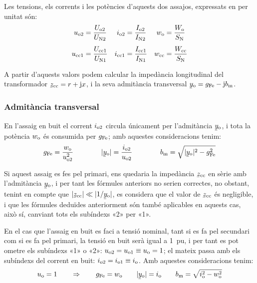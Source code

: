 Les tensions, els corrents i les potències d'aquests dos  assajos,
expressats en per unitat són:
\begin{align}
    u_\mathrm{o2} &=\frac{U_\mathrm{o2}}{U_\mathrm{N2}} &
    i_\mathrm{o2} &=\frac{I_\mathrm{o2}}{I_\mathrm{N2}} &
    w_\mathrm{o}  &=\frac{W_\mathrm{o}}{S_\mathrm{N}} \\[1ex]
    u_\mathrm{cc1} &=\frac{U_\mathrm{cc1}}{U_\mathrm{N1}} &
    i_\mathrm{cc1} &=\frac{I_\mathrm{cc1}}{I_\mathrm{N1}} &
    w_\mathrm{cc} &=\frac{W_\mathrm{cc}}{S_\mathrm{N}}
\end{align}

A partir d'aquests valors podem calcular la impedància longitudinal
del transformador $\cmplx{z}\ped{cc}=r+\ju x$, i la seva admitància
transversal $\cmplx{y}\ped{o}=g\ped{Fe}-\ju b\ped{m}$.

\subsubsection{Admitància transversal}

En l'assaig en buit el corrent $i_\mathrm{o2}$ circula
únicament per l'admitància $\cmplx{y}\ped{o}$, i tota la potència
$w_\mathrm{o}$ és consumida per $g_\mathrm{Fe}$; amb aquestes consideracions
tenim:
\begin{equation}
    g\ped{Fe} = \frac{w\ped{o}}{u\ped{o2}^2} \qquad\qquad
    |\cmplx{y}\ped{o}| = \frac{i\ped{o2}}{u\ped{o2}}
    \qquad\qquad
    b\ped{m} = \sqrt{|\cmplx{y}\ped{o}|^2 - g\ped{Fe}^2}
\end{equation}

Si aquest assaig es fes pel primari, ens quedaria la impedància
$\cmplx{z}\ped{cc}$ en sèrie amb l'admitància $\cmplx{y}\ped{o}$, i
per tant les fórmules anteriors no serien correctes, no obstant,
tenint en compte que $|\cmplx{z}\ped{cc}| \ll |1/\cmplx{y}\ped{o}|$,
es  considera que el valor de $\cmplx{z}\ped{cc}$ és negligible, i
que les fórmules deduïdes anteriorment són també aplicables en
aquests cas, això sí, canviant tots els subíndexs «2» per «1».

En el cas que l'assaig en buit es faci a tensió nominal, tant  si es
fa pel secundari com si es fa pel primari, la tensió en buit serà
igual a \SI{1}{pu}, i per tant es pot ometre els subíndexs «1» o «2»:
$u_\mathrm{o2} = u_\mathrm{o1} \equiv u_\mathrm{o} = 1$; el mateix passa amb els
subíndexs del corrent en buit: $i_\mathrm{o2} = i_\mathrm{o1} \equiv
i_\mathrm{o}$. Amb aquestes consideracions tenim:
\begin{equation}
    u\ped{o} = 1 \qquad \Rightarrow \qquad g\ped{Fe} = w\ped{o} \qquad
    |\cmplx{y}\ped{o}| = i\ped{o} \qquad
    b\ped{m} = \sqrt{i\ped{o}^2 - w\ped{o}^2}
    \label{eq:assaig-buit-nomianl}
\end{equation}

